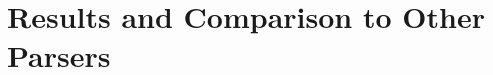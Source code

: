 \documentclass[../../document.tex]{subfiles}
\begin{document}
    \section{Results and Comparison to Other Parsers}
\end{document}

